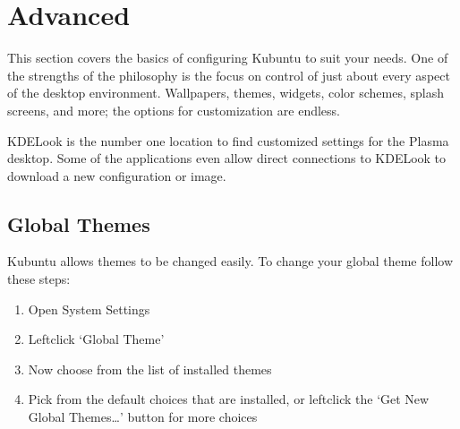 \documentclass[letterpaper,10pt,english]{sphinxmanual}
\begin{document}
\sphinxAtStartPar
{\hyperref[\detokenize{docs/desktop-guide/basic:basic}]{}}


\section{Advanced}
\label{\detokenize{docs/desktop-guide/advanced:advanced}}\label{\detokenize{docs/desktop-guide/advanced:advanced-link}}\label{\detokenize{docs/desktop-guide/advanced::doc}}
\sphinxAtStartPar
This section covers the basics of configuring Kubuntu to suit your needs. One of the strengths of the  philosophy is the focus on control of just about every aspect of the desktop environment. Wallpapers, themes, widgets, color schemes, splash screens, and more; the options for customization are endless.

\sphinxAtStartPar
KDE\sphinxhyphen{}Look is the number one location to find customized settings for the  Plasma desktop. Some of the applications even allow direct connections to KDE\sphinxhyphen{}Look to download a new configuration or image.


\subsection{Global Themes}
\label{\detokenize{docs/desktop-guide/advanced:global-themes}}
\sphinxAtStartPar
Kubuntu allows themes to be changed easily. To change your global theme follow these steps:
\begin{enumerate}
%
\item {} 
\sphinxAtStartPar
Open System Settings

\item {} 
\sphinxAtStartPar
Left\sphinxhyphen{}click ‘Global Theme’

\item {} 
\sphinxAtStartPar
Now choose from the list of installed themes

\item {} 
\sphinxAtStartPar
Pick from the default choices that are installed, or left\sphinxhyphen{}click the ‘Get New Global Themes…’ button for more choices

\end{enumerate}
\end{document}
